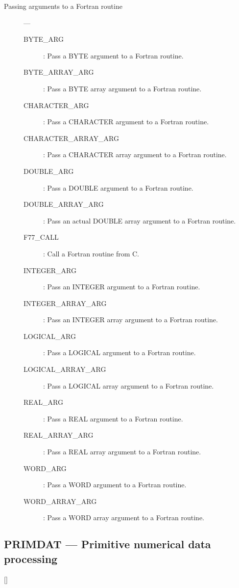\begin{description}
\item [Passing arguments to a Fortran routine] ---

\begin{description}
\item [BYTE\_ARG] : Pass a BYTE argument to a Fortran routine.
\item [BYTE\_ARRAY\_ARG] : Pass a BYTE array argument to a Fortran routine.
\item [CHARACTER\_ARG] : Pass a CHARACTER argument to a Fortran routine.
\item [CHARACTER\_ARRAY\_ARG] : Pass a CHARACTER array argument to a Fortran routine.
\item [DOUBLE\_ARG] : Pass a DOUBLE argument to a Fortran routine.
\item [DOUBLE\_ARRAY\_ARG] : Pass an actual DOUBLE array argument to a Fortran routine.
\item [F77\_CALL] : Call a Fortran routine from C.
\item [INTEGER\_ARG] : Pass an INTEGER argument to a Fortran routine.
\item [INTEGER\_ARRAY\_ARG] : Pass an INTEGER array argument to a Fortran routine.
\item [LOGICAL\_ARG] : Pass a LOGICAL argument to a Fortran routine.
\item [LOGICAL\_ARRAY\_ARG] : Pass a LOGICAL array argument to a Fortran routine.
\item [REAL\_ARG] : Pass a REAL argument to a Fortran routine.
\item [REAL\_ARRAY\_ARG] : Pass a REAL array argument to a Fortran routine.
\item [WORD\_ARG] : Pass a WORD argument to a Fortran routine.
\item [WORD\_ARRAY\_ARG] : Pass a WORD array argument to a Fortran routine.
\end{description}

\end{description}

\newpage

\subsection{PRIMDAT --- Primitive numerical data processing}

\vspace{-9mm}

\hfill []

\vspace{2mm}

